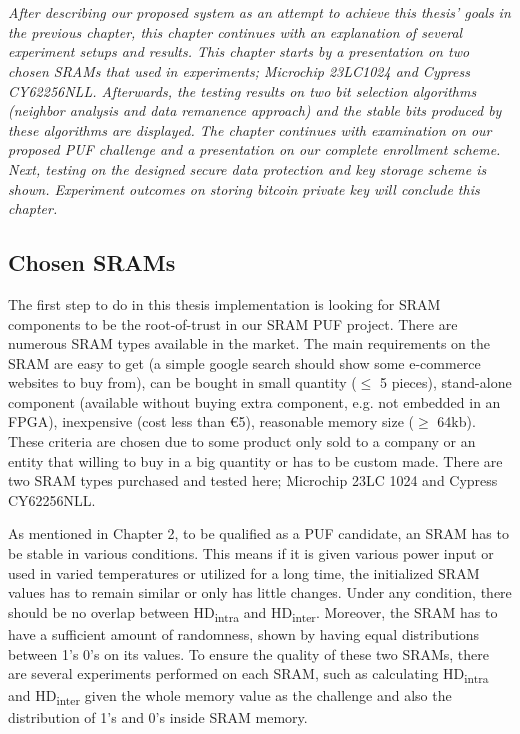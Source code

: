 \chapter{\chapterFive}
\label{chp:5}

\textit{After describing our proposed system as an attempt to achieve this thesis' goals in the previous chapter, this chapter continues with an explanation of several experiment setups and results. This chapter starts by a presentation on two chosen SRAMs that used in experiments; Microchip 23LC1024 and Cypress CY62256NLL. Afterwards, the testing results on two bit selection algorithms (neighbor analysis and data remanence approach) and the stable bits produced by these algorithms are displayed. The chapter continues with examination on our proposed PUF challenge and a presentation on our complete enrollment scheme. Next, testing on the designed secure data protection and key storage scheme is shown. Experiment outcomes on storing bitcoin private key will conclude this chapter.}

\section{Chosen SRAMs}
The first step to do in this thesis implementation is looking for SRAM components to be the root-of-trust in our SRAM PUF project.
There are numerous SRAM types available in the market. The main requirements on the SRAM are easy to get (a simple google search should show some e-commerce websites to buy from), can be bought in small quantity ($\leq$ 5 pieces), stand-alone component (available without buying extra component, e.g. not embedded in an FPGA), inexpensive (cost less than \euro{}5), reasonable memory size ($\geq$ 64kb). These criteria are chosen due to some product only sold to a company or an entity that willing to buy in a big quantity or has to be custom made. There are two SRAM types purchased and tested here; Microchip 23LC 1024 and Cypress CY62256NLL.

As mentioned in Chapter 2, to be qualified as a PUF candidate, an SRAM has to be stable in various conditions. This means if it is given various power input or used in varied temperatures or utilized for a long time, the initialized SRAM values has to remain similar or only has little changes. Under any condition, there should be no overlap between HD\textsubscript{intra} and HD\textsubscript{inter}. Moreover, the SRAM has to have a sufficient amount of randomness, shown by having equal distributions between 1's 0's on its values.  To ensure the quality of these two SRAMs, there are several experiments performed on each SRAM, such as calculating HD\textsubscript{intra} and HD\textsubscript{inter} given the whole memory value as the challenge and also the distribution of 1's and 0's inside SRAM memory.


